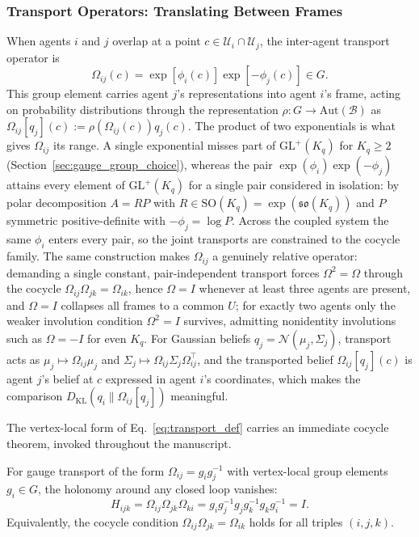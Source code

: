 \subsubsection{Transport Operators: Translating Between Frames}
\label{sec:transport}

When agents $i$ and $j$ overlap at a point $c \in \mathcal{U}_i \cap \mathcal{U}_j$, the inter-agent transport operator is
\begin{equation}
\Omega_{ij}(c) = \exp[\phi_i(c)] \exp[-\phi_j(c)] \in G.
\label{eq:transport_def}
\end{equation}
This group element carries agent $j$'s representations into agent $i$'s frame, acting on probability distributions through the representation $\rho: G \to \mathrm{Aut}(\mathcal{B})$ as $\Omega_{ij}[q_j](c) := \rho(\Omega_{ij}(c)) q_j(c)$. The product of two exponentials is what gives $\Omega_{ij}$ its range. A single exponential misses part of $\mathrm{GL}^+(K_q)$ for $K_q \geq 2$ (Section~\ref{sec:gauge_group_choice}), whereas the pair $\exp(\phi_i)\exp(-\phi_j)$ attains every element of $\mathrm{GL}^+(K_q)$ for a single pair considered in isolation: by polar decomposition $A = RP$ with $R \in \mathrm{SO}(K_q) = \exp(\mathfrak{so}(K_q))$ and $P$ symmetric positive-definite with $-\phi_j = \log P$. Across the coupled system the same $\phi_i$ enters every pair, so the joint transports are constrained to the cocycle family. The same construction makes $\Omega_{ij}$ a genuinely relative operator: demanding a single constant, pair-independent transport forces $\Omega^2 = \Omega$ through the cocycle $\Omega_{ij}\Omega_{jk} = \Omega_{ik}$, hence $\Omega = I$ whenever at least three agents are present, and $\Omega = I$ collapses all frames to a common $U$; for exactly two agents only the weaker involution condition $\Omega^2 = I$ survives, admitting nonidentity involutions such as $\Omega = -I$ for even $K_q$. For Gaussian beliefs $q_j = \mathcal{N}(\mu_j, \Sigma_j)$, transport acts as $\mu_j \mapsto \Omega_{ij}\mu_j$ and $\Sigma_j \mapsto \Omega_{ij}\Sigma_j \Omega_{ij}^\top$, and the transported belief $\Omega_{ij}[q_j](c)$ is agent $j$'s belief at $c$ expressed in agent $i$'s coordinates, which makes the comparison $D_{\mathrm{KL}}(q_i \| \Omega_{ij}[q_j])$ meaningful.

The vertex-local form of Eq.~\eqref{eq:transport_def} carries an immediate cocycle theorem, invoked throughout the manuscript.

\begin{lemma}
\label{thm:vanishing_holonomy}
For gauge transport of the form $\Omega_{ij} = g_ig_j^{-1}$ with vertex-local group elements $g_i \in G$, the holonomy around any closed loop vanishes:
\begin{equation}
H_{ijk} = \Omega_{ij}\Omega_{jk}\Omega_{ki}
= g_ig_j^{-1}g_jg_k^{-1}g_kg_i^{-1}
= I.
\label{eq:holonomy}
\end{equation}
Equivalently, the cocycle condition $\Omega_{ij}\Omega_{jk} = \Omega_{ik}$ holds for all triples $(i,j,k)$.
\end{lemma}

